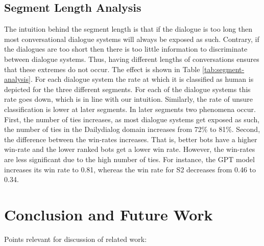 \documentclass[11pt,a4paper]{article}
\begin{document}
\subsection{Segment Length Analysis}

The intuition behind the segment length is that if the dialogue is too long then most conversational dialogue systems will always be exposed as such. Contrary, if the dialogues are too short then there is too little information to discriminate between dialogue systems. Thus, having different lengths of conversations ensures that these extremes do not occur. The effect is shown in Table \ref{tab:segment-analysis}. For each dialogue system the rate at which it is classified as human is depicted for the three different segments. For each of the dialogue systems this rate goes down, which is in line with our intuition. Similarly, the rate of unsure classification is lower at later segments. In later segments two phenomena occur. First, the number of ties increases, as most dialogue systems get exposed as such, the number of ties in the Dailydialog domain increases from 72\% to 81\%. Second, the difference between the win-rates increases. That is, better bots have a higher win-rate and the lower ranked bots get a lower win rate. However, the win-rates are less significant due to the high number of ties. For instance, the GPT model increases its win rate to 0.81, whereas the win rate for S2 decreases from 0.46 to 0.34.


\section{Conclusion and Future Work}
Points relevant for discussion of related work:
\end{document}
